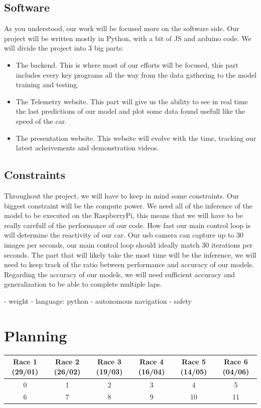 \documentclass[12pt]{article}
\begin{document}
\subsection{Software}
As you understood, our work will be focused more on the software side.
Our project will be written mostly in Python, with a bit of JS and arduino code.
We will divide the project into 3 big parts:
\begin{itemize}
\item The backend. This is where most of our efforts will be focused, this part includes every key programs all the way from the data gathering to the model training and testing.
\item The Telemetry website. This part will give us the ability to see in real time the last predictions of our model and plot some data found usefull like the speed of the car.
\item The presentation website. This website will evolve with the time, tracking our latest acheivements and demonstration videos.
\end{itemize}

 
\subsection{Constraints}
Throughout the project, we will have to keep in mind some constraints.
Our biggest constraint will be the compute power. We need all of the inference of the model to be executed on the RaspberryPi, this means that we will have to be really carefull of the performance of our code. How fast our main control loop is will determine the reactivity of our car. Our usb camera can capture up to 30 images per seconds, our main control loop should ideally match 30 iterations per seconds. The part that will likely take the most time will be the inference, we will need to keep track of the ratio between performance and accuracy of our models.
Regarding the accuracy of our models, we will need sufficient accuracy and generalization to be able to complete multiple laps.

- weight
- language: python
- autonomous navigation
- safety

\section {Planning}
{
\begin{tabular}{|c|c|c|c|c|c|}
  \hline
  Race 1 \tiny{(29/01)} & Race 2 \tiny{(26/02)} & Race 3 \tiny{(19/03)} &  Race 4 \tiny{(16/04)} &  Race 5 \tiny{(14/05)} &  Race 6 \tiny{(04/06)} \\
  \hline
  0 & 1 & 2 & 3 & 4 & 5 \\
  \hline
  6 & 7 & 8 & 9 & 10 & 11 \\
  \hline
\end{tabular}
}
\end{document}
